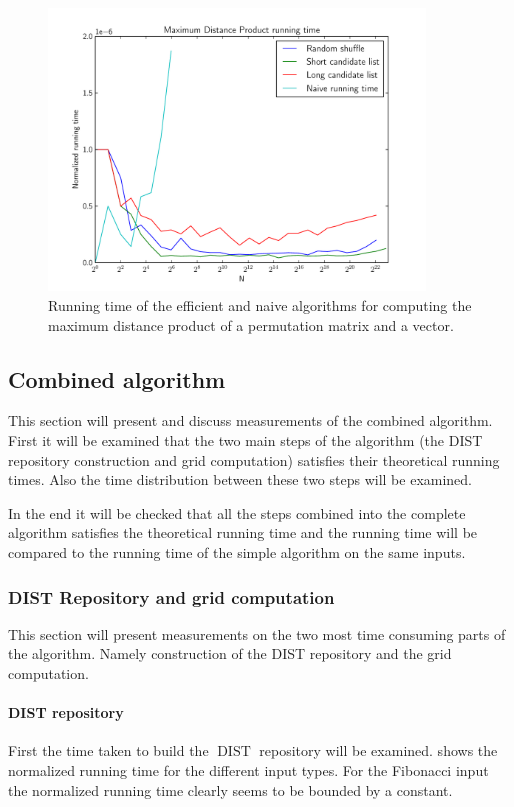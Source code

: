 \documentclass[twoside,11pt,openright]{report}
\newcommand{\DIST}{\operatorname{DIST}}
\begin{document}
\begin{figure}[h!]
  \centering
  \includegraphics[width=10cm]{distance-mult/max-dist-mult}
  \caption{Running time of the efficient and naive algorithms for computing the maximum distance product of a permutation matrix and a vector.}
  \label{fig:benchmark:max-distance}
\end{figure}

\subsection{Combined algorithm}
This section will present and discuss measurements of the combined algorithm. First it will be examined that the two main steps of the algorithm (the DIST repository construction and grid computation) satisfies their theoretical running times. Also the time distribution between these two steps will be examined.

In the end it will be checked that all the steps combined into the complete algorithm satisfies the theoretical running time and the running time will be compared to the running time of the simple algorithm on the same inputs.

\subsubsection{DIST Repository and grid computation}
This section will present measurements on the two most time consuming parts of the algorithm. Namely construction of the DIST repository and the grid computation.

\paragraph{DIST repository}
First the time taken to build the $\DIST$ repository will be examined.  shows the normalized running time for the different input types. For the Fibonacci input the normalized running time clearly seems to be bounded by a constant.
\end{document}
